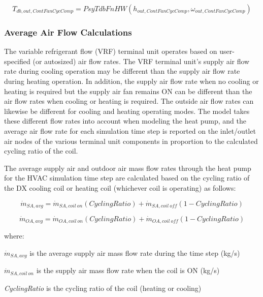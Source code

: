 \begin{equation}
{T_{db,out,ContFanCycComp}} = PsyTdbFnHW\left( {{h_{out,ContFanCycComp}},{\omega_{out,ContFanCycComp}}} \right)
\end{equation}

\subsubsection{Average Air Flow Calculations}\label{average-air-flow-calculations}

The variable refrigerant flow (VRF) terminal unit operates based on user-specified (or autosized) air flow rates. The VRF terminal unit's supply air flow rate during cooling operation may be different than the supply air flow rate during heating operation. In addition, the supply air flow rate when no cooling or heating is required but the supply air fan remains ON can be different than the air flow rates when cooling or heating is required. The outside air flow rates can likewise be different for cooling and heating operating modes. The model takes these different flow rates into account when modeling the heat pump, and the average air flow rate for each simulation time step is reported on the inlet/outlet air nodes of the various terminal unit components in proportion to the calculated cycling ratio of the coil.

The average supply air and outdoor air mass flow rates through the heat pump for the HVAC simulation time step are calculated based on the cycling ratio of the DX cooling coil or heating coil (whichever coil is operating) as follows:

\begin{equation}
\dot{m}_{SA,avg} = \dot{m}_{SA,coil~on} \left( {CyclingRatio} \right) + \dot{m}_{SA,coil~off} \left( {1 - CyclingRatio} \right)
\end{equation}

\begin{equation}
\dot{m}_{OA,avg} = \dot{m}_{OA,coil~on} \left( {CyclingRatio} \right) + \dot{m}_{OA,coil~off} \left( {1 - CyclingRatio} \right)
\end{equation}

where:

\(\dot{m}_{SA,avg}\) is the average supply air mass flow rate during the time step (kg/s)

\(\dot{m}_{SA,coil~on}\) is the supply air mass flow rate when the coil is ON (kg/s)

\emph{CyclingRatio} is the cycling ratio of the coil (heating or cooling)

